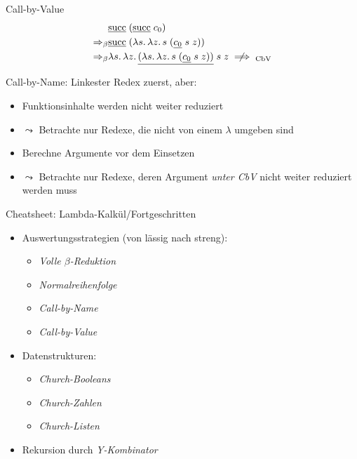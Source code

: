 \documentclass{beamer}
\begin{document}
\begin{frame}{Call-by-Value}
        \begin{eqnarray*}
          &
          \app{
            \uline{\csucc}
          }{
            (\app{\uline{\csucc}}{\cn{0}})
          } \\
          \Rightarrow_\beta&
          \app{
            \uline{\csucc}
          }{
            (\lam{s}{\lam{z}{
              \app{s}{
                (\app{\app{\uline{\cn{0}}}{s}}{z})
              }
            }})
          } \\
          \Rightarrow_\beta&
          \lam{s}{\lam{z}{
          \app{\app{
            \uline{(\lam{s}{\lam{z}{
              \app{s}{
                (\app{\app{\uline{\cn{0}}}{s}}{z})
              }
            }})}
          }{s}}{z}
          }} \centernot\implies_\text{CbV}
        \end{eqnarray*}
        \vfill

        Call-by-Name: Linkester Redex zuerst, aber:

        \begin{itemize}
          \item Funktionsinhalte werden nicht weiter reduziert
          \item $\leadsto$ Betrachte nur Redexe, die nicht von einem $\lambda$ umgeben sind
          \item Berechne Argumente vor dem Einsetzen
          \item $\leadsto$ Betrachte nur Redexe, deren Argument \emph{unter CbV} nicht weiter reduziert werden muss
        \end{itemize}
\end{frame}

\begin{frame}{Cheatsheet: Lambda-Kalkül/Fortgeschritten}
  \begin{itemize}
    \item Auswertungsstrategien (von lässig nach streng):
    \begin{itemize}
      \item \emph{Volle $\beta$-Reduktion}
      \item \emph{Normalreihenfolge}
      \item \emph{Call-by-Name}
      \item \emph{Call-by-Value}
    \end{itemize}
    \item Datenstrukturen:
    \begin{itemize}
      \item \emph{Church-Booleans}
      \item \emph{Church-Zahlen}
      \item \emph{Church-Listen}
    \end{itemize}
    \item Rekursion durch \emph{Y-Kombinator}
  \end{itemize}
\end{frame}
\end{document}
